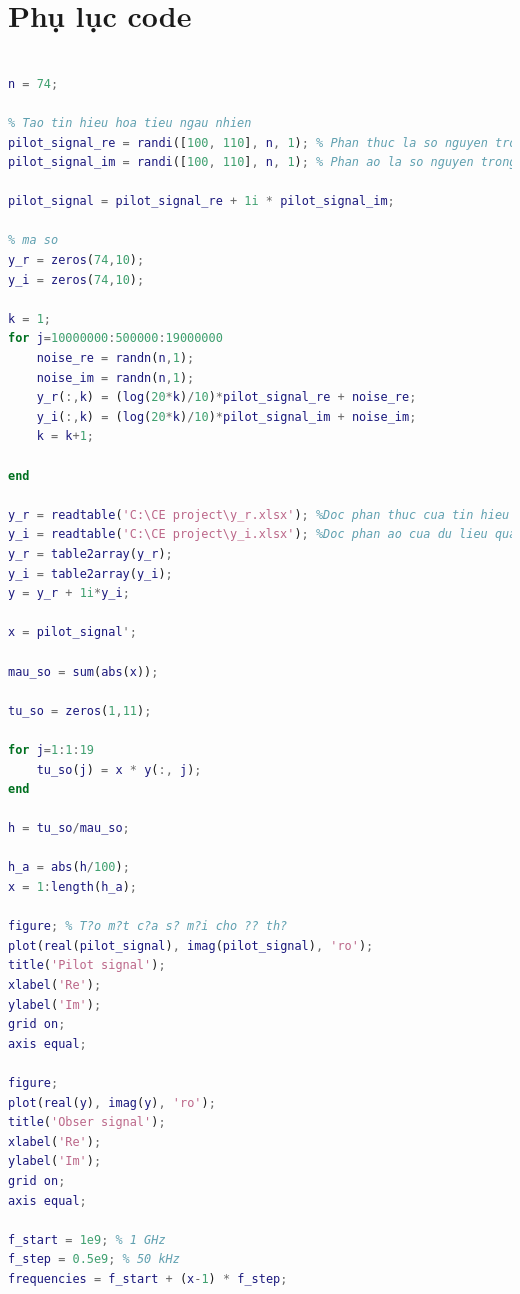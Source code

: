 \documentclass{article}
\begin{document}
\newpage
\section{Phụ lục code}
\begin{lstlisting}[language=Matlab, caption=Kênh truyền ngõ vào đơn ngõ ra đơn]

n = 74;

% Tao tin hieu hoa tieu ngau nhien
pilot_signal_re = randi([100, 110], n, 1); % Phan thuc la so nguyen trong [-100, 110]
pilot_signal_im = randi([100, 110], n, 1); % Phan ao la so nguyen trong [100, 110]

pilot_signal = pilot_signal_re + 1i * pilot_signal_im;

% ma so
y_r = zeros(74,10);
y_i = zeros(74,10);

k = 1;
for j=10000000:500000:19000000 
    noise_re = randn(n,1);
    noise_im = randn(n,1);
    y_r(:,k) = (log(20*k)/10)*pilot_signal_re + noise_re;
    y_i(:,k) = (log(20*k)/10)*pilot_signal_im + noise_im;
    k = k+1;
   
end

y_r = readtable('C:\CE project\y_r.xlsx'); %Doc phan thuc cua tin hieu quan sat
y_i = readtable('C:\CE project\y_i.xlsx'); %Doc phan ao cua du lieu quan sat
y_r = table2array(y_r);
y_i = table2array(y_i);
y = y_r + 1i*y_i;

x = pilot_signal';

mau_so = sum(abs(x));

tu_so = zeros(1,11);

for j=1:1:19
    tu_so(j) = x * y(:, j);  
end

h = tu_so/mau_so;

h_a = abs(h/100);
x = 1:length(h_a);

figure; % T?o m?t c?a s? m?i cho ?? th?
plot(real(pilot_signal), imag(pilot_signal), 'ro'); 
title('Pilot signal');
xlabel('Re');
ylabel('Im');
grid on; 
axis equal;

figure; 
plot(real(y), imag(y), 'ro'); 
title('Obser signal');
xlabel('Re');
ylabel('Im');
grid on; 
axis equal;

f_start = 1e9; % 1 GHz
f_step = 0.5e9; % 50 kHz
frequencies = f_start + (x-1) * f_step; 


\end{lstlisting}
\end{document}
